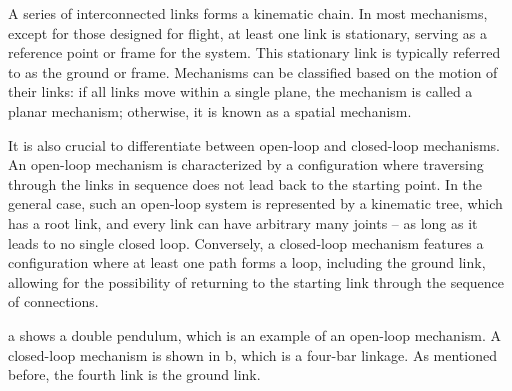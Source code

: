A series of interconnected links forms a kinematic chain. In most mechanisms, except for those designed for flight, at least one link is stationary, serving as a reference point or frame for the system. This stationary link is typically referred to as the ground or frame. Mechanisms can be classified based on the motion of their links: if all links move within a single plane, the mechanism is called a planar mechanism; otherwise, it is known as a spatial mechanism.

It is also crucial to differentiate between open-loop and closed-loop mechanisms. An open-loop mechanism is characterized by a configuration where traversing through the links in sequence does not lead back to the starting point. In the general case, such an open-loop system is represented by a kinematic tree, which has a root link, and every link can have arbitrary many joints -- as long as it leads to no single closed loop. 
Conversely, a closed-loop mechanism features a configuration where at least one path forms a loop, including the ground link, allowing for the possibility of returning to the starting link through the sequence of connections.

a shows a double pendulum, which is an example of an open-loop mechanism.
A closed-loop mechanism is shown in b, which is a four-bar linkage. 
As mentioned before, the fourth link is the ground link.
%

